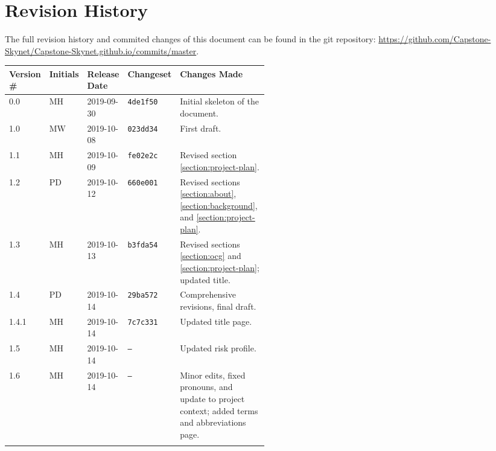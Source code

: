 \thispagestyle{empty}
\section*{Revision History}
The full revision history and commited changes of this document can be found in the git repository: \href{https://github.com/Capstone-Skynet/Capstone-Skynet.github.io}{https://github.com/Capstone-Skynet/Capstone-Skynet.github.io/commits/master}.

\begin{table}[H]
\begin{tabular}{*{4}{l}p{0.5\linewidth}}
\hline
Version \# & Initials & Release Date & Changeset & Changes Made \\ \hline

0.0 & MH & 2019-09-30 & \texttt{4de1f50} & Initial skeleton of the document.\\
1.0 & MW & 2019-10-08 & \texttt{023dd34} & First draft.\\
1.1 & MH & 2019-10-09 & \texttt{fe02e2c} & Revised section \ref{section:project-plan}.\\
1.2 & PD & 2019-10-12 & \texttt{660e001} & Revised sections \ref{section:about}, \ref{section:background}, and \ref{section:project-plan}.\\
1.3 & MH & 2019-10-13 & \texttt{b3fda54} & Revised sections \ref{section:ocg} and \ref{section:project-plan}; updated title.\\
1.4 & PD & 2019-10-14 & \texttt{29ba572} & Comprehensive revisions, final draft.\\
1.4.1 & MH & 2019-10-14 & \texttt{7c7c331} & Updated title page. \\
1.5 & MH & 2019-10-14 & \texttt{--} & Updated risk profile. \\
1.6 & MH & 2019-10-14 & \texttt{--} & Minor edits, fixed pronouns, and update to project context; added terms and abbreviations page.\\

 & & & \\ \hline
\end{tabular}
\end{table}